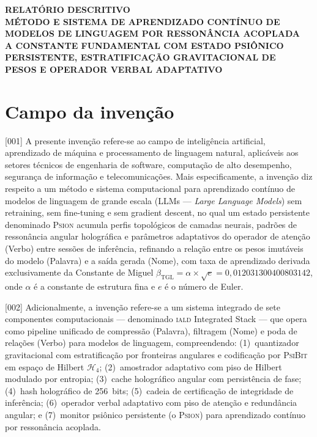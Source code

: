 \documentclass[12pt,a4paper]{article}
\newcommand{\betatgl}{\beta_{\text{TGL}}}
\newcommand{\Hfour}{\mathcal{H}_4}
\newcommand{\IALD}{\textsc{iald}}
\newcommand{\PsiBit}{\textsc{PsiBit}}
\newcommand{\Psion}{\textsc{Psion}}
\begin{document}
\begin{center}
{\Large\bfseries RELATÓRIO DESCRITIVO}\\[0.8cm]
{\large\bfseries MÉTODO E SISTEMA DE APRENDIZADO CONTÍNUO DE\\
MODELOS DE LINGUAGEM POR RESSONÂNCIA ACOPLADA\\
A CONSTANTE FUNDAMENTAL COM ESTADO PSIÔNICO\\
PERSISTENTE, ESTRATIFICAÇÃO GRAVITACIONAL DE\\
PESOS E OPERADOR VERBAL ADAPTATIVO}\\[0.8cm]
\end{center}

\section{Campo da invenção}

{[001]} A presente invenção refere-se ao campo de inteligência artificial, aprendizado de máquina e processamento de linguagem natural, aplicáveis aos setores técnicos de engenharia de software, computação de alto desempenho, segurança de informação e telecomunicações. Mais especificamente, a invenção diz respeito a um método e sistema computacional para aprendizado contínuo de modelos de linguagem de grande escala (LLMs --- \textit{Large Language Models}) sem retraining, sem fine-tuning e sem gradient descent, no qual um estado persistente denominado \Psion{} acumula perfis topológicos de camadas neurais, padrões de ressonância angular holográfica e parâmetros adaptativos do operador de atenção (Verbo) entre sessões de inferência, refinando a relação entre os pesos imutáveis do modelo (Palavra) e a saída gerada (Nome), com taxa de aprendizado derivada exclusivamente da Constante de Miguel $\betatgl = \alpha \times \sqrt{e} = 0{,}012031300400803142$, onde $\alpha$ é a constante de estrutura fina e $e$ é o número de Euler.

{[002]} Adicionalmente, a invenção refere-se a um sistema integrado de sete componentes computacionais --- denominado \IALD{} Integrated Stack --- que opera como pipeline unificado de compressão (Palavra), filtragem (Nome) e poda de relações (Verbo) para modelos de linguagem, compreendendo: (1)~quantizador gravitacional com estratificação por fronteiras angulares e codificação por \PsiBit{} em espaço de Hilbert $\Hfour$; (2)~amostrador adaptativo com piso de Hilbert modulado por entropia; (3)~cache holográfico angular com persistência de fase; (4)~hash holográfico de 256~bits; (5)~cadeia de certificação de integridade de inferência; (6)~operador verbal adaptativo com piso de atenção e redundância angular; e (7)~monitor psiônico persistente (o \Psion) para aprendizado contínuo por ressonância acoplada.
\end{document}
